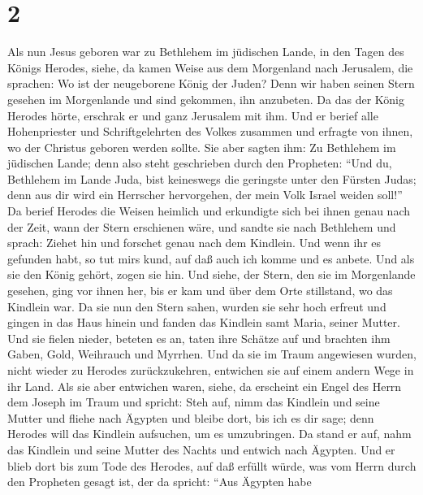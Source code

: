 \hypertarget{section-1}{%
\section{2}\label{section-1}}

 Als nun Jesus geboren war zu Bethlehem im jüdischen
Lande, in den Tagen des Königs Herodes, siehe, da kamen Weise aus dem
Morgenland nach Jerusalem, die sprachen:  Wo ist der
neugeborene König der Juden? Denn wir haben seinen Stern gesehen im
Morgenlande und sind gekommen, ihn anzubeten.  Da das der
König Herodes hörte, erschrak er und ganz Jerusalem mit ihm.
 Und er berief alle Hohenpriester und Schriftgelehrten des
Volkes zusammen und erfragte von ihnen, wo der Christus geboren werden
sollte.  Sie aber sagten ihm: Zu Bethlehem im jüdischen
Lande; denn also steht geschrieben durch den Propheten: 
``Und du, Bethlehem im Lande Juda, bist keineswegs die geringste unter
den Fürsten Judas; denn aus dir wird ein Herrscher hervorgehen, der mein
Volk Israel weiden soll!''  Da berief Herodes die Weisen
heimlich und erkundigte sich bei ihnen genau nach der Zeit, wann der
Stern erschienen wäre,  und sandte sie nach Bethlehem und
sprach: Ziehet hin und forschet genau nach dem Kindlein. Und wenn ihr es
gefunden habt, so tut mir\textquotesingle s kund, auf daß auch ich komme
und es anbete.  Und als sie den König gehört, zogen sie
hin. Und siehe, der Stern, den sie im Morgenlande gesehen, ging vor
ihnen her, bis er kam und über dem Orte stillstand, wo das Kindlein war.
 Da sie nun den Stern sahen, wurden sie sehr hoch erfreut
 und gingen in das Haus hinein und fanden das Kindlein
samt Maria, seiner Mutter. Und sie fielen nieder, beteten es an, taten
ihre Schätze auf und brachten ihm Gaben, Gold, Weihrauch und Myrrhen.
 Und da sie im Traum angewiesen wurden, nicht wieder zu
Herodes zurückzukehren, entwichen sie auf einem andern Wege in ihr Land.
 Als sie aber entwichen waren, siehe, da erscheint ein
Engel des Herrn dem Joseph im Traum und spricht: Steh auf, nimm das
Kindlein und seine Mutter und fliehe nach Ägypten und bleibe dort, bis
ich es dir sage; denn Herodes will das Kindlein aufsuchen, um es
umzubringen.  Da stand er auf, nahm das Kindlein und
seine Mutter des Nachts und entwich nach Ägypten.  Und er
blieb dort bis zum Tode des Herodes, auf daß erfüllt würde, was vom
Herrn durch den Propheten gesagt ist, der da spricht: ``Aus Ägypten habe
